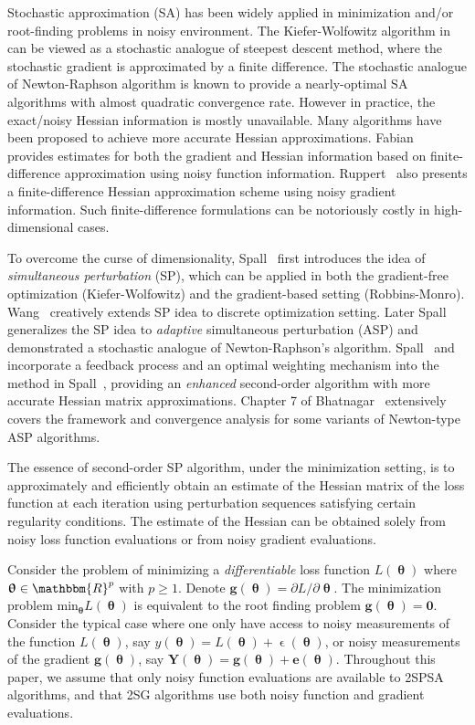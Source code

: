 \documentclass[conference]{IEEEtran}
\begin{document}
Stochastic approximation (SA) has been widely applied in minimization and/or
root-finding problems in noisy environment. The Kiefer-Wolfowitz algorithm in \cite{Kiefer1952} can be viewed as a stochastic analogue of steepest descent method, where the stochastic gradient is approximated by a finite difference. The stochastic analogue of Newton-Raphson algorithm is known to provide a nearly-optimal SA algorithms with almost quadratic convergence rate. However in practice, the exact/noisy Hessian information is mostly unavailable. Many algorithms have been proposed to achieve more accurate Hessian approximations. Fabian~\cite{Fabian1971} provides estimates for both the gradient and Hessian information based on finite-difference approximation using noisy function information. Ruppert~\cite{Ruppert1985} also presents a finite-difference Hessian approximation scheme using noisy gradient information. Such finite-difference formulations can be notoriously costly in high-dimensional cases. 

To overcome the curse of dimensionality, Spall~\cite{Spall1992} first introduces the idea of \textit{simultaneous perturbation} (SP), which can be applied
in both the gradient-free optimization (Kiefer-Wolfowitz) and the
gradient-based setting (Robbins-Monro).  Wang~\cite{Wang2011} creatively extends SP idea to discrete optimization setting. Later Spall~\cite{Spall2000}
generalizes the SP idea to \textit{adaptive} simultaneous perturbation (ASP) and demonstrated a stochastic
analogue of Newton-Raphson's algorithm.  Spall~\cite{Spall2007} and \cite{Spall2009} incorporate a feedback process and an optimal weighting mechanism into the method in Spall~\cite{Spall2000}, providing an
\textit{enhanced} second-order algorithm with more accurate Hessian matrix approximations. Chapter 7 of Bhatnagar~\cite{Bhatnagar2012} extensively covers the framework and convergence analysis for some variants of Newton-type ASP algorithms.

The essence of second-order SP algorithm, under the minimization setting,
is to approximately and efficiently obtain an estimate of the
Hessian matrix of the loss function at each
iteration using perturbation sequences satisfying certain regularity
conditions. The estimate of the Hessian can be obtained solely from
noisy loss function evaluations or from noisy gradient
evaluations.

Consider the problem of minimizing a
\textit{differentiable} loss function $ L(\bm{\uptheta}) $ where
$ \bm{\uptheta} \in \mathbbm{R}^p $ with $ p\ge1 $. Denote
$\bm{g}(\bm{\uptheta})={\partial L}/{\partial \bm{\uptheta}}$. The
minimization problem ${\text{min}}_{\bm{\uptheta}}L(\bm{\uptheta})$ is
equivalent to the root finding problem $\bm{g}(\bm{\uptheta})=\bm{0}$.
Consider the typical case where one only have access to noisy measurements of
the function $ L(\bm{\uptheta}) $, say
$ y(\bm{\uptheta})=L(\bm{\uptheta})+\upvarepsilon(\bm{\uptheta}) $, or
noisy measurements of the gradient $\bm{g}(\bm{\uptheta})$, say
$\bm{Y}(\bm{\uptheta})=\bm{g}(\bm{\uptheta})+\bm{e}(\bm{\uptheta})$. Throughout this paper, we assume that only noisy function
evaluations are available to 2SPSA algorithms, and that 2SG algorithms use both noisy function and gradient evaluations.
\end{document}
